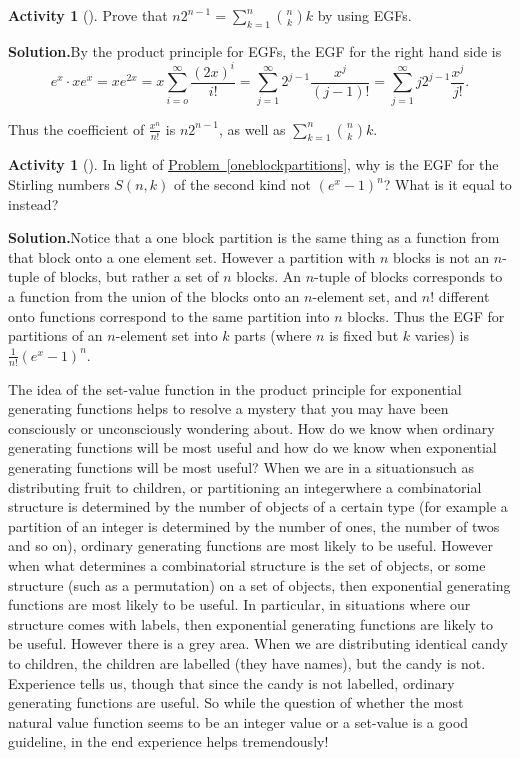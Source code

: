 \documentclass[10pt,]{book}
\theoremstyle{plain}
\theoremstyle{definition}
\newtheorem{activity}[project]{Activity}
\numberwithin{equation}{chapter}
\begin{document}
\begin{activity}[]\label{activity-381}
Prove that \(n2^{n-1} = \sum_{k=1}^n \binom{n}{k}k\) by using EGFs.%
\par\medskip\noindent%
\textbf{Solution.}\quad By the product principle for EGFs, the EGF for the right hand side is%
\begin{equation*}
e^x\cdot xe^x =xe^{2x}=x\sum_{i=o}^\infty \frac{(2x)^i}{i!} =
\sum_{j=1}^\infty 2^{j-1}\frac{x^j}{(j-1)!}=\sum_{j=1}^\infty
j2^{j-1}\frac{x^j}{j!}.
\end{equation*}
%
\par
Thus the coefficient of \(\frac{x^n}{n!}\) is \(n2^{n-1}\), as well as \(\sum_{k=1}^n \binom{n}{k}k\).%
\end{activity}
\begin{activity}[]\label{activity-382}
In light of \hyperref[oneblockpartitions]{Problem~\ref{oneblockpartitions}}, why is the EGF for the Stirling numbers \(S(n,k)\) of the second kind not \((e^x -1)^n\)? What is it equal to instead?%
\par\medskip\noindent%
\textbf{Solution.}\quad Notice that a one block partition is the same thing as a function from that block onto a one element set. However a partition with \(n\) blocks is not an \(n\)-tuple of blocks, but rather a set of \(n\) blocks. An \(n\)-tuple of blocks corresponds to a function from the union of the blocks onto an \(n\)-element set, and \(n!\) different onto functions correspond to the same partition into \(n\) blocks. Thus the EGF for partitions of an \(n\)-element set into \(k\) parts (where \(n\) is fixed but \(k\) varies) is \(\frac{1}{n!} (e^x -1)^n\).%
\end{activity}
The idea of the set-value function in the product principle for exponential generating functions helps to resolve a mystery that you may have been consciously or unconsciously wondering about. How do we know when ordinary generating functions will be most useful and how do we know when exponential generating functions will be most useful? When we are in a situation\textemdash{}such as distributing fruit to children, or partitioning an integer\textemdash{}where a combinatorial structure is determined by the number of objects of a certain type (for example a partition of an integer is determined by the number of ones, the number of twos and so on), ordinary generating functions are most likely to be useful. However when what determines a combinatorial structure is the set of objects, or some structure (such as a permutation) on a set of objects, then exponential generating functions are most likely to be useful. In particular, in situations where our structure comes with labels, then exponential generating functions are likely to be useful. However there is a grey area. When we are distributing identical candy to children, the children are labelled (they have names), but the candy is not. Experience tells us, though that since the candy is not labelled, ordinary generating functions are useful. So while the question of whether the most natural value function seems to be an integer value or a set-value is a good guideline, in the end experience helps tremendously!%
\typeout{************************************************}
\typeout{************************************************}
\end{document}
